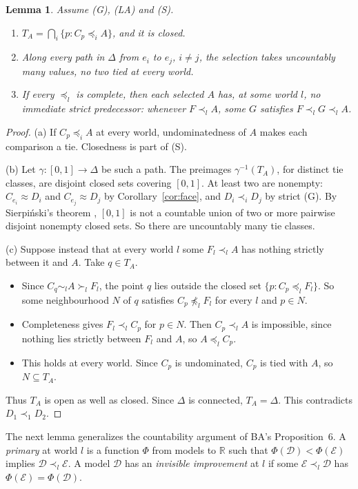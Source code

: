 \documentclass[11pt]{article}
\newtheorem{lemma}[theorem]{Lemma}
\theoremstyle{remark}\newtheorem{remark}[theorem]{Remark}
\newcommand{\R}{\mathbb R}
\newcommand{\Dscr}{\mathcal D}
\newcommand{\Escr}{\mathcal E}
\begin{document}
\begin{lemma}\label{lem:fibres}
Assume (G), (LA) and (S).
\begin{enumerate}[label=(\alph*)]
\item $T_A=\bigcap_i\{p:C_p\preceq_iA\}$, and it is closed.
\item Along every path in $\Delta$ from $e_i$ to $e_j$, $i\ne j$, the selection
takes uncountably many values, no two tied at every world.
\item If every $\preceq_l$ is complete, then each selected $A$ has, at some
world $l$, no immediate strict predecessor: whenever $F\prec_lA$, some $G$
satisfies $F\prec_lG\prec_lA$.
\end{enumerate}
\end{lemma}
\begin{proof}
(a) If $C_p\preceq_iA$ at every world, undominatedness of $A$ makes each
comparison a tie. Closedness is part of (S).

(b) Let $\gamma:[0,1]\to\Delta$ be such a path. The preimages
$\gamma^{-1}(T_A)$, for distinct tie classes, are disjoint closed sets
covering $[0,1]$. At least two are nonempty: $C_{e_i}\approx D_i$ and
$C_{e_j}\approx D_j$ by Corollary~\ref{cor:face}, and $D_i\prec_iD_j$ by strict (G).
By Sierpi\'nski's theorem \cite{Sierpinski}, $[0,1]$ is not a countable union
of two or more pairwise disjoint nonempty closed sets. So there are
uncountably many tie classes.

(c) Suppose instead that at every world $l$ some $F_l\prec_lA$ has nothing
strictly between it and $A$. Take $q\in T_A$.
\begin{itemize}[leftmargin=*,itemsep=2pt]
\item Since $C_q\sim_lA\succ_lF_l$, the point $q$ lies outside the closed set
$\{p:C_p\preceq_lF_l\}$. So some neighbourhood $N$ of $q$ satisfies
$C_p\not\preceq_lF_l$ for every $l$ and $p\in N$.
\item Completeness gives $F_l\prec_lC_p$ for $p\in N$. Then $C_p\prec_lA$ is
impossible, since nothing lies strictly between $F_l$ and $A$, so
$A\preceq_lC_p$.
\item This holds at every world. Since $C_p$ is undominated, $C_p$ is tied
with $A$, so $N\subseteq T_A$.
\end{itemize}
Thus $T_A$ is open as well as closed. Since $\Delta$ is connected,
$T_A=\Delta$. This contradicts $D_1\prec_1D_2$.
\end{proof}

The next lemma generalizes the countability argument of BA's Proposition~6.
A \emph{primary} at world $l$ is a function $\Phi$ from models to $\R$ such
that $\Phi(\Dscr)<\Phi(\Escr)$ implies $\Dscr\prec_l\Escr$. A model $\Dscr$ has
an \emph{invisible improvement} at $l$ if some $\Escr\prec_l\Dscr$ has
$\Phi(\Escr)=\Phi(\Dscr)$.
\end{document}
